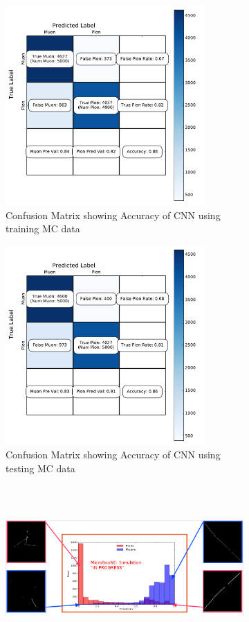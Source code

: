 \begin{figure}[htp!]
\centering
	\begin{subfigure}[b]{.45\textwidth}
	\includegraphics[width=\textwidth,height=3in]{figs/train_confusion.pdf}
	\caption{Confusion Matrix showing Accuracy of CNN using training MC data}
	\label{fig:confusion}
	\end{subfigure}
	\quad
	\begin{subfigure}[b]{.45\textwidth}
	\includegraphics[width=\textwidth,height=3in]{figs/val_confusion.pdf}
	\caption{Confusion Matrix showing Accuracy of CNN using testing MC data}
	\label{fig:confusion_test}
	\end{subfigure}
	\quad
	\begin{subfigure}[b]{\textwidth}
	\includegraphics[width=\textwidth,height=2.5in]{figs/mitch_hw.png}

\end{subfigure}
\end{figure}
